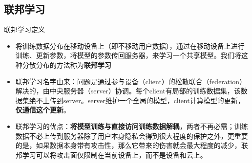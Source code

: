 \documentclass{beamer}
\begin{document}
\subsection{联邦学习}
\begin{frame}{\songti 联邦学习定义}
    \vspace{65pt}
    \begin{itemize}
        \item {\fontsize{8pt}{2pt}将训练数据分布在移动设备上（即不移动用户数据），通过在移动设备上进行训练、更新参数，将模型的参数传回服务器，来学习一个共享模型。我们将这种分散分布的方法称为\textbf{联邦学习}}
        \vspace{-3pt}
        \item {\fontsize{8pt}{2pt}联邦学习名字由来：问题是通过参与设备（client）的松散联合（federation）解决的，由中央服务器（server）协调。每个client有局部的训练数据集，该数据集绝不上传到server。server维护一个全局的模型，client计算模型的更新，\textbf{仅通信这个更新}。}
        \vspace{-3pt}
        \item {\fontsize{8pt}{2pt}联邦学习的优点：\textbf{将模型训练与直接访问训练数据解耦}，两者不再必需；训练数据不必上传到服务器除了用户本身隐私会得到很大程度的保护之外，更重要的是，如果数据本身带有攻击性，那么它带来的伤害就会最大程度的减少，联邦学习可以将攻击面仅限制在当前设备上，而不是设备和云上。}
    \end{itemize}
\end{frame}
\end{document}
